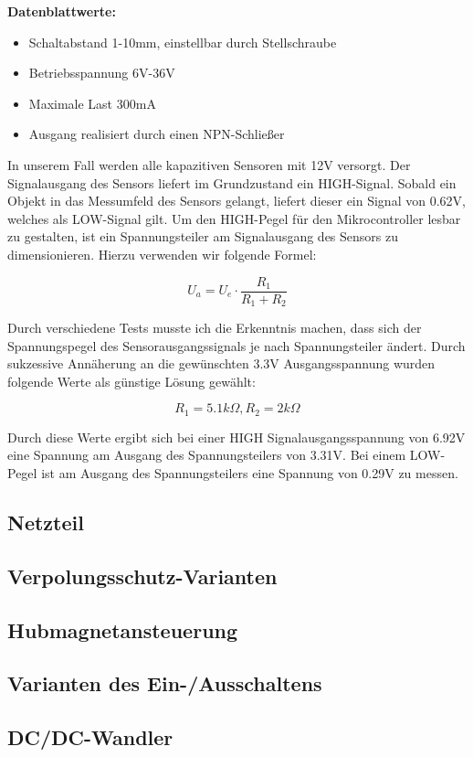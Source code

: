 \textbf{Datenblattwerte:} \\

\begin{itemize}
    \item Schaltabstand 1-10mm, einstellbar durch Stellschraube
    \item Betriebsspannung 6V-36V
    \item Maximale Last 300mA
    \item Ausgang realisiert durch einen NPN-Schließer
\end{itemize}



In unserem Fall werden alle kapazitiven Sensoren mit 12V versorgt. Der Signalausgang des Sensors liefert im Grundzustand ein HIGH-Signal.
Sobald ein Objekt in das Messumfeld des Sensors gelangt, liefert dieser ein Signal von 0.62V, welches als LOW-Signal gilt.
Um den HIGH-Pegel für den Mikrocontroller lesbar zu gestalten, ist ein Spannungsteiler am Signalausgang des Sensors zu dimensionieren. Hierzu verwenden wir folgende Formel:

\begin{equation}
    U_a = U_e \cdot \frac{R_1}{R_1 + R_2}
\end{equation}


Durch verschiedene Tests musste ich die Erkenntnis machen, dass sich der Spannungspegel des Sensorausgangssignals je nach Spannungsteiler ändert.
Durch sukzessive Annäherung an die gewünschten 3.3V Ausgangsspannung wurden folgende Werte als günstige Lösung gewählt:

\begin{equation*}
    R_1 = 5.1k\Omega, R_2 = 2k\Omega
\end{equation*}

Durch diese Werte ergibt sich bei einer HIGH Signalausgangsspannung von 6.92V eine Spannung am Ausgang des Spannungsteilers von 3.31V.
Bei einem LOW-Pegel ist am Ausgang des Spannungsteilers eine Spannung von 0.29V zu messen.


\subsection{Netzteil}

\subsection{Verpolungsschutz-Varianten}

\subsection{Hubmagnetansteuerung}

\subsection{Varianten des Ein-/Ausschaltens}

\subsection{DC/DC-Wandler}




